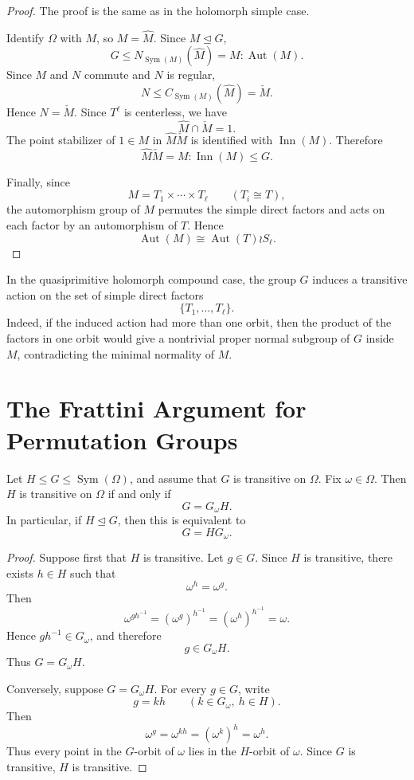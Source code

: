 \begin{proof}
The proof is the same as in the holomorph simple case.

Identify \(\Omega\) with \(M\), so \(M=\widehat M\). Since \(M\unlhd G\),
\[
    G\leq N_{\operatorname{Sym}(M)}(\widehat M)
    =
    M:\operatorname{Aut}(M).
\]
Since \(M\) and \(N\) commute and \(N\) is regular,
\[
    N\leq C_{\operatorname{Sym}(M)}(\widehat M)=\check M.
\]
Hence \(N=\check M\). Since \(T^\ell\) is centerless, we have
\[
    \widehat M\cap \check M=1.
\]
The point stabilizer of \(1\in M\) in \(\widehat M\check M\) is identified with
\(\operatorname{Inn}(M)\). Therefore
\[
    \widehat M\check M
    =
    M:\operatorname{Inn}(M)
    \leq G.
\]

Finally, since
\[
    M=T_1\times \cdots \times T_\ell
    \qquad
    (T_i\cong T),
\]
the automorphism group of \(M\) permutes the simple direct factors and acts on
each factor by an automorphism of \(T\). Hence
\[
    \operatorname{Aut}(M)
    \cong
    \operatorname{Aut}(T)\wr S_\ell.
\]
\end{proof}

\begin{remark}
In the quasiprimitive holomorph compound case, the group \(G\) induces a
transitive action on the set of simple direct factors
\[
    \{T_1,\dots,T_\ell\}.
\]
Indeed, if the induced action had more than one orbit, then the product of the
factors in one orbit would give a nontrivial proper normal subgroup of \(G\)
inside \(M\), contradicting the minimal normality of \(M\).
\end{remark}

\section{The Frattini Argument for Permutation Groups}

\begin{lemma}
Let \(H\leq G\leq \operatorname{Sym}(\Omega)\), and assume that \(G\) is
transitive on \(\Omega\). Fix \(\omega\in\Omega\). Then \(H\) is transitive on
\(\Omega\) if and only if
\[
    G=G_\omega H.
\]
In particular, if \(H\unlhd G\), then this is equivalent to
\[
    G=HG_\omega.
\]
\end{lemma}

\begin{proof}
Suppose first that \(H\) is transitive. Let \(g\in G\). Since \(H\) is transitive,
there exists \(h\in H\) such that
\[
    \omega^h=\omega^g.
\]
Then
\[
    \omega^{gh^{-1}}
    =
    (\omega^g)^{h^{-1}}
    =
    (\omega^h)^{h^{-1}}
    =
    \omega.
\]
Hence \(gh^{-1}\in G_\omega\), and therefore
\[
    g\in G_\omega H.
\]
Thus \(G=G_\omega H\).

Conversely, suppose \(G=G_\omega H\). For every \(g\in G\), write
\[
    g=kh
    \qquad
    (k\in G_\omega,\ h\in H).
\]
Then
\[
    \omega^g
    =
    \omega^{kh}
    =
    (\omega^k)^h
    =
    \omega^h.
\]
Thus every point in the \(G\)-orbit of \(\omega\) lies in the \(H\)-orbit of
\(\omega\). Since \(G\) is transitive, \(H\) is transitive.
\end{proof}

